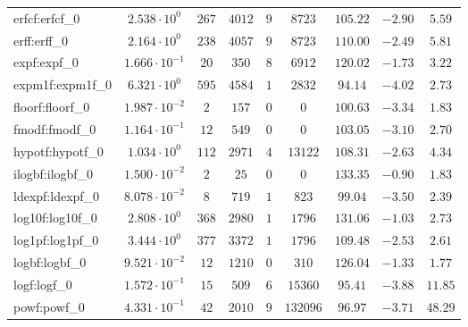 \begin{tabular}{|l|c|c|c|c|c|c|c|c|}
erfcf:erfcf\_0               & $ 2.538 \cdot 10^{0}  $ & $ 267    $ & $ 4012   $ & $ 9   $ & $ 8723   $ & $ 105.22      $ & $ -2.90   $ & $ 5.59    $ \\
erff:erff\_0                 & $ 2.164 \cdot 10^{0}  $ & $ 238    $ & $ 4057   $ & $ 9   $ & $ 8723   $ & $ 110.00      $ & $ -2.49   $ & $ 5.81    $ \\
expf:expf\_0                 & $ 1.666 \cdot 10^{-1} $ & $ 20     $ & $ 350    $ & $ 8   $ & $ 6912   $ & $ 120.02      $ & $ -1.73   $ & $ 3.22    $ \\
expm1f:expm1f\_0             & $ 6.321 \cdot 10^{0}  $ & $ 595    $ & $ 4584   $ & $ 1   $ & $ 2832   $ & $ 94.14       $ & $ -4.02   $ & $ 2.73    $ \\
floorf:floorf\_0             & $ 1.987 \cdot 10^{-2} $ & $ 2      $ & $ 157    $ & $ 0   $ & $ 0      $ & $ 100.63      $ & $ -3.34   $ & $ 1.83    $ \\
fmodf:fmodf\_0               & $ 1.164 \cdot 10^{-1} $ & $ 12     $ & $ 549    $ & $ 0   $ & $ 0      $ & $ 103.05      $ & $ -3.10   $ & $ 2.70    $ \\
hypotf:hypotf\_0             & $ 1.034 \cdot 10^{0}  $ & $ 112    $ & $ 2971   $ & $ 4   $ & $ 13122  $ & $ 108.31      $ & $ -2.63   $ & $ 4.34    $ \\
ilogbf:ilogbf\_0             & $ 1.500 \cdot 10^{-2} $ & $ 2      $ & $ 25     $ & $ 0   $ & $ 0      $ & $ 133.35      $ & $ -0.90   $ & $ 1.83    $ \\
ldexpf:ldexpf\_0             & $ 8.078 \cdot 10^{-2} $ & $ 8      $ & $ 719    $ & $ 1   $ & $ 823    $ & $ 99.04       $ & $ -3.50   $ & $ 2.39    $ \\
log10f:log10f\_0             & $ 2.808 \cdot 10^{0}  $ & $ 368    $ & $ 2980   $ & $ 1   $ & $ 1796   $ & $ 131.06      $ & $ -1.03   $ & $ 2.73    $ \\
log1pf:log1pf\_0             & $ 3.444 \cdot 10^{0}  $ & $ 377    $ & $ 3372   $ & $ 1   $ & $ 1796   $ & $ 109.48      $ & $ -2.53   $ & $ 2.61    $ \\
logbf:logbf\_0               & $ 9.521 \cdot 10^{-2} $ & $ 12     $ & $ 1210   $ & $ 0   $ & $ 310    $ & $ 126.04      $ & $ -1.33   $ & $ 1.77    $ \\
logf:logf\_0                 & $ 1.572 \cdot 10^{-1} $ & $ 15     $ & $ 509    $ & $ 6   $ & $ 15360  $ & $ 95.41       $ & $ -3.88   $ & $ 11.85   $ \\
powf:powf\_0                 & $ 4.331 \cdot 10^{-1} $ & $ 42     $ & $ 2010   $ & $ 9   $ & $ 132096 $ & $ 96.97       $ & $ -3.71   $ & $ 48.29   $ \\

\end{tabular}
